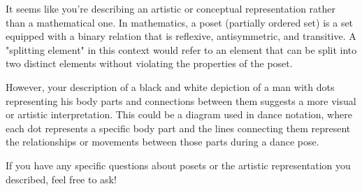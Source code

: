It seems like you're describing an artistic or conceptual representation rather than a mathematical one. In mathematics, a poset (partially ordered set) is a set equipped with a binary relation that is reflexive, antisymmetric, and transitive. A "splitting element" in this context would refer to an element that can be split into two distinct elements without violating the properties of the poset.

However, your description of a black and white depiction of a man with dots representing his body parts and connections between them suggests a more visual or artistic interpretation. This could be a diagram used in dance notation, where each dot represents a specific body part and the lines connecting them represent the relationships or movements between those parts during a dance pose.

If you have any specific questions about posets or the artistic representation you described, feel free to ask!